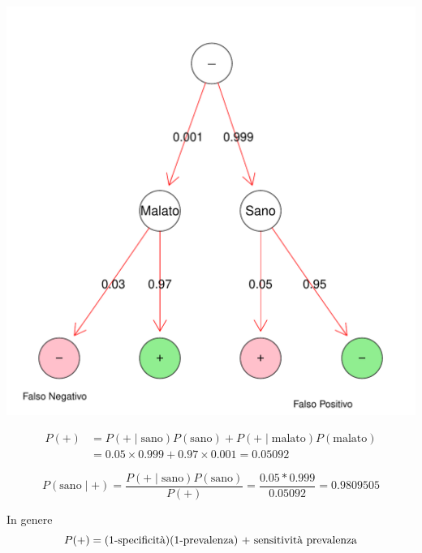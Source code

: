 \documentclass[onecolumn,12pt]{book}\usepackage[]{graphicx}\usepackage[]{color}
\makeatletter
\def\maxwidth{ %
  \ifdim\Gin@nat@width>\linewidth
    \linewidth
  \else
    \Gin@nat@width
  \fi
}
\newenvironment{knitrout}{}{} %
\makeatother
\begin{document}
\begin{knitrout}
\color{fgcolor}
\includegraphics[width=\maxwidth]{figure/unnamed-chunk-24-1} 

\end{knitrout}

\begin{align*}P(+) &= P(+ \mid  \textrm{sano})P(\textrm{sano}) + P( + \mid \textrm{malato})P(\textrm{malato}) \\
&=0.05\times 0.999 + 0.97\times  0.001=0.05092
\end{align*}
 

$$ P(\textrm{sano} \mid   +) = \dfrac{P( +\mid  \textrm{sano}) P(\textrm{sano})}{P(+)}=\dfrac{0.05*0.999}{0.05092}=0.9809505$$


 


In genere
$$P(+) = \hbox{(1-specificità)(1-prevalenza) + sensitività prevalenza}$$
\end{document}
